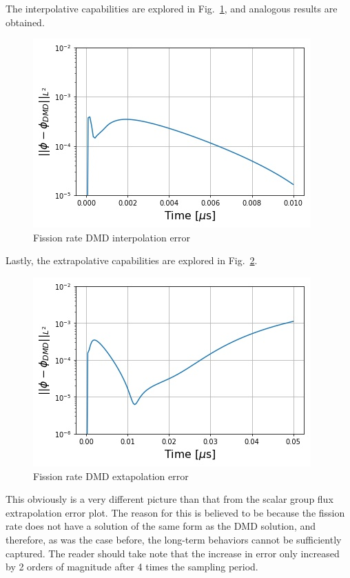 \documentclass{style/nseJournal}
\newcommand{\LFI}[1]{\label{fi:#1}}
\newcommand{\FI}[1]{Fig.~\ref{fi:#1}}
\newcommand{\bfg}{\begin{figure}}
\newcommand{\efg}{\end{figure}}
\begin{document}
The interpolative capabilities are explored in \FI{interp-fis}, and analogous results are obtained.
\bfg[!htb] \centering
	\includegraphics[scale=0.5]{figures/fis_interp_error.jpg}
	\caption{Fission rate DMD interpolation error}
	\LFI{interp-fis}
\efg
Lastly, the extrapolative capabilities are explored in \FI{extrap-fis}. 
\bfg[t] \centering
	\includegraphics[scale=0.5]{figures/fis_extrap_error.jpg}
	\caption{Fission rate DMD extapolation error}
	\LFI{extrap-fis}
\efg
This obviously is a very different picture than that from the scalar group flux extrapolation error plot.  
The reason for this is believed to be because the fission rate does not have a solution of the same form as the DMD solution, and therefore, as was the case before, the long-term behaviors cannot be sufficiently captured.  
The reader should take note that the increase in error only increased by 2 orders of magnitude after 4 times the sampling period.  
\end{document}
